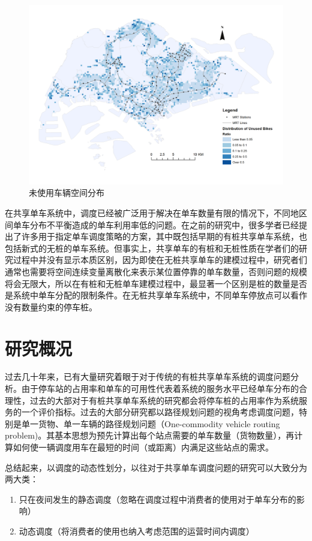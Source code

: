 \documentclass[]{tongjithesis}
\numberwithin{equation}{chapter}
\begin{document}
\begin{figure}[H]
	\centering
	\includegraphics[width= 0.9 \textwidth]{figures_main/unused_spatial_distribution_ratio.png}
	\caption{未使用车辆空间分布}
	\label{spatial_unused}
\end{figure}

在共享单车系统中，调度已经被广泛用于解决在单车数量有限的情况下，不同地区间单车分布不平衡造成的单车利用率低的问题。在之前的研究中，很多学者已经提出了许多用于指定单车调度策略的方案，其中既包括早期的有桩共享单车系统，也包括新式的无桩的单车系统。但事实上，共享单车的有桩和无桩性质在学者们的研究过程中并没有显示本质区别，因为即使在无桩共享单车的建模过程中，研究者们通常也需要将空间连续变量离散化来表示某位置停靠的单车数量，否则问题的规模将会无限大，所以在有桩和无桩单车建模过程中，最显著一个区别是桩的数量是否是系统中单车分配的限制条件。在无桩共享单车系统中，不同单车停放点可以看作没有数量约束的停车桩。

\section{研究概况}
过去几十年来，已有大量研究着眼于对于传统的有桩共享单车系统的调度问题分析。由于停车站的占用率和单车的可用性代表着系统的服务水平已经单车分布的合理性，过去的大部对于有桩共享单车系统的研究都会将停车桩的占用率作为系统服务的一个评价指标。过去的大部分研究都以路径规划问题的视角考虑调度问题，特别是单一货物、单一车辆的路径规划问题（One-commodity vehicle routing problem)。其基本思想为预先计算出每个站点需要的单车数量（货物数量），再计算如何使一辆调度用车在最短的时间（或距离）内满足这些站点的需求。

总结起来，以调度的动态性划分，以往对于共享单车调度问题的研究可以大致分为两大类：\par
\begin{enumerate}
	\item 只在夜间发生的静态调度（忽略在调度过程中消费者的使用对于单车分布的影响）
	\item 动态调度（将消费者的使用也纳入考虑范围的运营时间内调度）
\end{enumerate}
\end{document}

